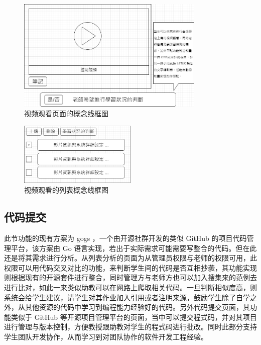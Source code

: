 \begin{figure}[htb]
\centering 
\includegraphics[width=0.80\textwidth]{img/ch1m5.png} 
\caption{视频观看页面的概念线框图}
\label{Test}
\end{figure}

\begin{figure}[htb]
\centering 
\includegraphics[width=0.50\textwidth]{img/ch1m6.png} 
\caption{视频观看的列表概念线框图}
\label{Test}
\end{figure}

\subsection{代码提交}

此节功能的现有方案为 gogs ，一个由开源社群开发的类似 GitHub 的项目代码管理平台，该方案由 Go 语言实现，若出于实际需求可能需要写整合的代码。但在此还是将其需求进行分析。从列表分析的页面为从管理员权限与老师的权限可用，此权限可以用代码交叉对比的功能，来判断学生间的代码是否互相抄袭，其功能实现则根据现有的开源套件进行整合，同时管理方与老师方也可以加入搜集来的范例去进行比对，如此一来类似助教可以在网路上爬取相关代码。一旦判断相似度高，则系统会给学生建议，请学生对其作业加入引用或者注明来源，鼓励学生除了自学之外，从其他资源的代码中学习到编程能力经验好的代码。另外代码提交页面，其功能类似于 GitHub 等开源项目管理平台的页面，当中可以提交程式码，并对其项目进行管理与版本控制，方便教授跟助教对学生的程式码进行批改。同时此部分支持学生团队开发协作，从而学习到对团队协作的软件开发工程经验。

